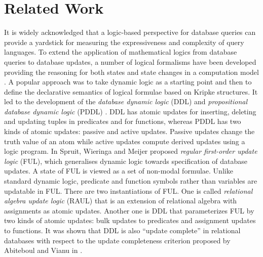 \documentclass[preprint,11pt]{elsarticle}
\theoremstyle{definition}
\theoremstyle{remark}
\begin{document}
\section{Related Work}\label{sec:relatedwork}
It is widely acknowledged that a logic-based perspective for
database queries can provide a yardstick for measuring the
expressiveness and complexity of query languages. To extend the
application of mathematical logics from database queries to database
updates, a number of logical formalisms have been developed
providing the reasoning for both states and state changes in a
computation model \cite{Survey98,LogicSurvey01}. A popular approach
was to take dynamic logic as a starting point and then to define the
declarative semantics of logical formulae based on Kripke
structures. It led to the development of the \emph{database dynamic
logic} (DDL) and \emph{propositional} \emph{database dynamic logic}
(PDDL) \cite{SpruitDDL92,SpruitPhDThesis94,SpruitPDDL95}. DDL has
atomic updates for inserting, deleting and updating tuples in
predicates and for functions, whereas PDDL has two kinds of atomic
updates: passive and active updates. Passive updates change the
truth value of an atom while active updates compute derived updates
using a logic program. In \cite{SpruitFUL01} Spruit, Wieringa and Meijer proposed \emph{regular
first-order update logic} (FUL), which generalises
dynamic logic towards specification of database updates. A state of
FUL is viewed as a set of non-modal formulae. Unlike standard
dynamic logic, predicate and function symbols rather than variables
are updatable in FUL. There are two instantiations of FUL. One is
called \emph{relational algebra update logic} (RAUL) that is an
extension of relational algebra with assignments as atomic updates.
Another one is DDL that parameterizes FUL by two kinds of atomic
updates: bulk updates to predicates and assignment updates to
functions. It was shown that DDL is also ``update complete'' in
relational databases with respect to the update completeness
criterion proposed by Abiteboul and Vianu in \cite{AbiteboulUpdate87}.
\end{document}
